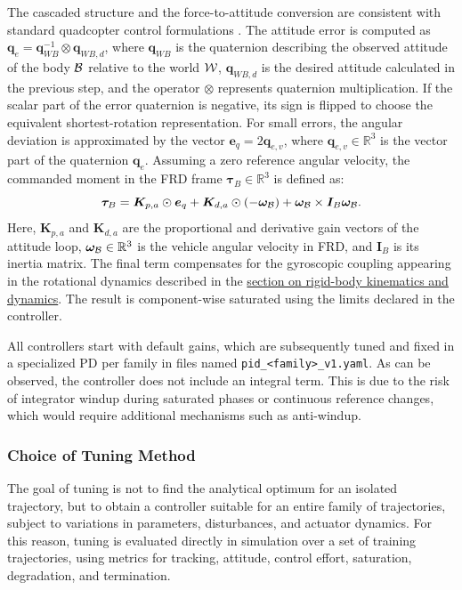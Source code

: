 The cascaded structure and the force-to-attitude conversion are consistent with standard quadcopter control formulations \cite{beard2012small,mellinger2011minimum}.
The attitude error is computed as $\bm{q}_e=\bm{q}_{WB}^{-1}\otimes\bm{q}_{WB,d}$, where $\bm{q}_{WB}$ is the quaternion describing the observed attitude of the body $\mathcal{B}$ relative to the world $\mathcal{W}$, $\bm{q}_{WB,d}$ is the desired attitude calculated in the previous step, and the operator $\otimes$ represents quaternion multiplication. If the scalar part of the error quaternion is negative, its sign is flipped to choose the equivalent shortest-rotation representation. For small errors, the angular deviation is approximated by the vector $\bm{e}_q=2\bm{q}_{e,v}$, where $\bm{q}_{e,v} \in \mathbb{R}^3$ is the vector part of the quaternion $\bm{q}_e$. Assuming a zero reference angular velocity, the commanded moment in the FRD frame $\bm{\tau}_B \in \mathbb{R}^3$ is defined as:
\begin{equation}
 \bm{\tau}_B=
 \bm{K}_{p,a}\odot\bm{e}_q
 +\bm{K}_{d,a}\odot(-\bm{\omega}_{\mathcal{B}})
 +\bm{\omega}_{\mathcal{B}}\times\bm{I}_B\bm{\omega}_{\mathcal{B}}.
 \label{eq:pd-actitud}
\end{equation}
Here, $\bm{K}_{p,a}$ and $\bm{K}_{d,a}$ are the proportional and derivative gain vectors of the attitude loop, $\bm{\omega}_{\mathcal{B}} \in \mathbb{R}^3$ is the vehicle angular velocity in FRD, and $\bm{I}_B$ is its inertia matrix. The final term compensates for the gyroscopic coupling appearing in the rotational dynamics described in the \hyperref[subsubsec:cinematica-dinamica-cuerpo]{section on rigid-body kinematics and dynamics}. The result is component-wise saturated using the limits declared in the controller.

All controllers start with default gains, which are subsequently tuned and fixed in a specialized PD per family in files named \texttt{pid\_<family>\_v1.yaml}. As can be observed, the controller does not include an integral term. This is due to the risk of integrator windup during saturated phases or continuous reference changes, which would require additional mechanisms such as anti-windup.

\subsubsection*{Choice of Tuning Method}

The goal of tuning is not to find the analytical optimum for an isolated trajectory, but to obtain a controller suitable for an entire family of trajectories, subject to variations in parameters, disturbances, and actuator dynamics. For this reason, tuning is evaluated directly in simulation over a set of training trajectories, using metrics for tracking, attitude, control effort, saturation, degradation, and termination.

